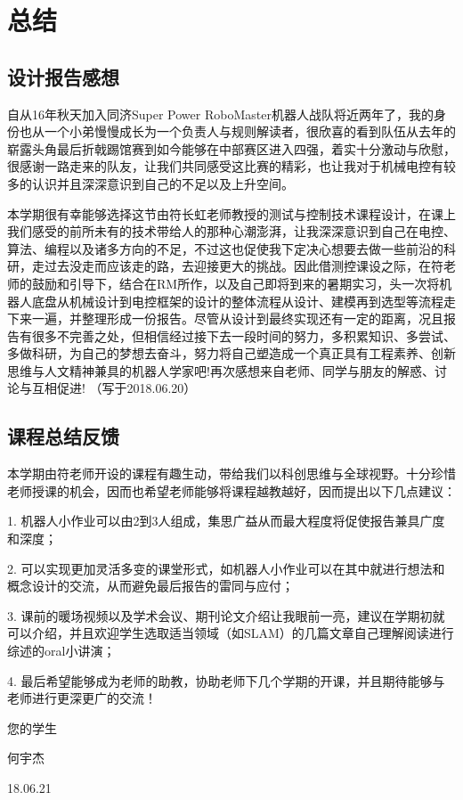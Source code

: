 \newpage
\section{总结}

\subsection{设计报告感想}

自从16年秋天加入同济Super Power RoboMaster机器人战队将近两年了，我的身份也从一个小弟慢慢成长为一个负责人与规则解读者，很欣喜的看到队伍从去年的崭露头角最后折戟踢馆赛到如今能够在中部赛区进入四强，着实十分激动与欣慰，很感谢一路走来的队友，让我们共同感受这比赛的精彩，也让我对于机械电控有较多的认识并且深深意识到自己的不足以及上升空间。

本学期很有幸能够选择这节由符长虹老师教授的测试与控制技术课程设计，在课上我们感受的前所未有的技术带给人的那种心潮澎湃，让我深深意识到自己在电控、算法、编程以及诸多方向的不足，不过这也促使我下定决心想要去做一些前沿的科研，走过去没走而应该走的路，去迎接更大的挑战。因此借测控课设之际，在符老师的鼓励和引导下，结合在RM所作，以及自己即将到来的暑期实习，头一次将机器人底盘从机械设计到电控框架的设计的整体流程从设计、建模再到选型等流程走下来一遍，并整理形成一份报告。尽管从设计到最终实现还有一定的距离，况且报告有很多不完善之处，但相信经过接下去一段时间的努力，多积累知识、多尝试、多做科研，为自己的梦想去奋斗，努力将自己塑造成一个真正具有工程素养、创新思维与人文精神兼具的机器人学家吧!再次感想来自老师、同学与朋友的解惑、讨论与互相促进!
（写于2018.06.20）

\subsection{课程总结反馈}

本学期由符老师开设的课程有趣生动，带给我们以科创思维与全球视野。十分珍惜老师授课的机会，因而也希望老师能够将课程越教越好，因而提出以下几点建议：

1. 机器人小作业可以由2到3人组成，集思广益从而最大程度将促使报告兼具广度和深度；

2. 可以实现更加灵活多变的课堂形式，如机器人小作业可以在其中就进行想法和概念设计的交流，从而避免最后报告的雷同与应付；

3. 课前的暖场视频以及学术会议、期刊论文介绍让我眼前一亮，建议在学期初就可以介绍，并且欢迎学生选取适当领域（如SLAM）的几篇文章自己理解阅读进行综述的oral小讲演；

4. 最后希望能够成为老师的助教，协助老师下几个学期的开课，并且期待能够与老师进行更深更广的交流！

\begin{flushright}
您的学生

何宇杰

18.06.21
\end{flushright}